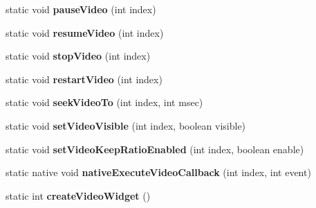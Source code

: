 \begin{DoxyCompactItemize}
static void {\bfseries pause\+Video} (int index)
\item 
\mbox{\label{classorg_1_1cocos2dx_1_1lib_1_1Cocos2dxVideoHelper_a5c5ef11f4d94caf26eb3a773cd4fcdd5}} 
static void {\bfseries resume\+Video} (int index)
\item 
\mbox{\label{classorg_1_1cocos2dx_1_1lib_1_1Cocos2dxVideoHelper_a4898234ff4997de05a6cb915eac94ec4}} 
static void {\bfseries stop\+Video} (int index)
\item 
\mbox{\label{classorg_1_1cocos2dx_1_1lib_1_1Cocos2dxVideoHelper_a8177a4fcac178fb4d12da2b8f33ec0aa}} 
static void {\bfseries restart\+Video} (int index)
\item 
\mbox{\label{classorg_1_1cocos2dx_1_1lib_1_1Cocos2dxVideoHelper_a98df60c8f207d12455b6ea15683b868c}} 
static void {\bfseries seek\+Video\+To} (int index, int msec)
\item 
\mbox{\label{classorg_1_1cocos2dx_1_1lib_1_1Cocos2dxVideoHelper_a91e8fa8107ad63e7dfb575ca55e46480}} 
static void {\bfseries set\+Video\+Visible} (int index, boolean visible)
\item 
\mbox{\label{classorg_1_1cocos2dx_1_1lib_1_1Cocos2dxVideoHelper_a808250609ecc8043573741ca4c4d46fc}} 
static void {\bfseries set\+Video\+Keep\+Ratio\+Enabled} (int index, boolean enable)
\item 
\mbox{\label{classorg_1_1cocos2dx_1_1lib_1_1Cocos2dxVideoHelper_acdc75b98349a6874fd29d8d7ecdfcf23}} 
static native void {\bfseries native\+Execute\+Video\+Callback} (int index, int event)
\item 
\mbox{\label{classorg_1_1cocos2dx_1_1lib_1_1Cocos2dxVideoHelper_a94ed06a7410c86c225d6e8dd80fff8b7}} 
static int {\bfseries create\+Video\+Widget} ()
\item 
\mbox{\label{classorg_1_1cocos2dx_1_1lib_1_1Cocos2dxVideoHelper_a8bdfc88257aa026e3ed9d92e5ac2a62f}} 

\end{DoxyCompactItemize}
